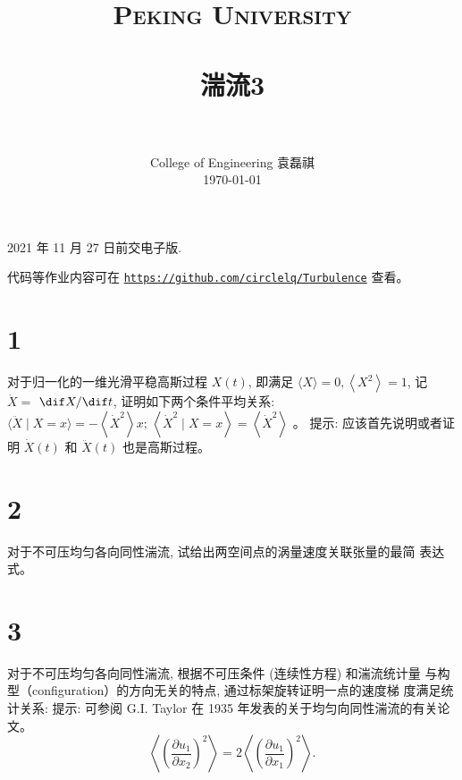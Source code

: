\documentclass[12pt,a4]{ctexart}
\title{
   \vspace{-1in}
   \usefont{OT1}{bch}{b}{n}
   \normalfont \normalsize \textsc{\LARGE Peking University}\\[1cm] %
   \horrule{0.5pt} \\[0.5cm]
   \huge \bfseries{湍流3} \\
   \horrule{2pt} \\[0.5cm]
}
\author{
   \normalfont									\normalsize
   College of Engineering \quad 2001111690  \quad 袁磊祺\\	\normalsize
   \today
}
\date{}
\begin{document}


\maketitle

2021 年 11 月 27 日前交电子版.

代码等作业内容可在 \texttt{\href{https://github.com/circlelq/Turbulence}{https://github.com/circlelq/Turbulence}} 查看。

\section{1}


对于归一化的一维光滑平稳高斯过程 $X(t)$, 即满足 $\langle X\rangle=0,\left\langle X^{2}\right\rangle=1$, 记 $\dot{X}=$ $\dif X / \dif t$, 证明如下两个条件平均关系: $\langle\ddot{X} \mid X=x\rangle=-\left\langle\dot{X}^{2}\right\rangle x ;\, \left\langle\dot{X}^{2} \mid X=x\right\rangle=\left\langle\dot{X}^{2}\right\rangle$ 。 提示: 应该首先说明或者证明 $\dot{X}(t)$ 和 $\ddot{X}(t)$ 也是高斯过程。

\section{2}
对于不可压均匀各向同性湍流, 试给出两空间点的涡量速度关联张量的最简 表达式。


\section{3}
对于不可压均匀各向同性湍流, 根据不可压条件 (连续性方程) 和湍流统计量 与构型（configuration）的方向无关的特点, 通过标架旋转证明一点的速度梯 度满足统计关系:
提示: 可参阅 G.I. Taylor 在 1935 年发表的关于均匀向同性湍流的有关论文。
\begin{equation}
   \left\langle\left(\frac{\partial u_{1}}{\partial x_{2}}\right)^{2}\right\rangle=2\left\langle\left(\frac{\partial u_{1}}{\partial x_{1}}\right)^{2}\right\rangle.
\end{equation}
\end{document}

